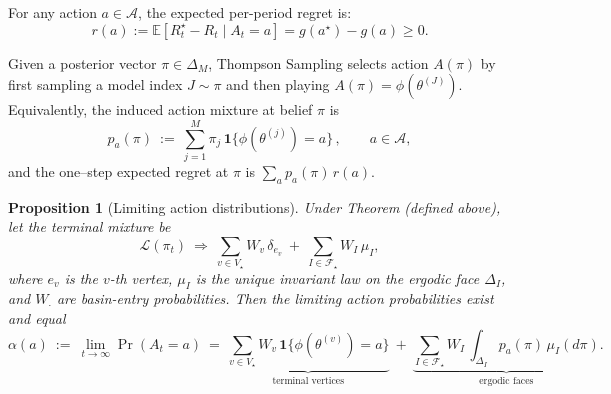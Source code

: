 \documentclass[12pt]{article}
\newtheorem{proposition}{Proposition}
\newcommand{\Law}{\mathcal{L}}
\begin{document}
For any action $a \in \mathcal{A}$, the expected per-period regret is:
\[
r(a) := \mathbb{E}[R_t^{\star} - R_t \mid A_t = a] = g(a^\star) - g(a) \geq 0.
\]

Given a posterior vector $\pi\in\Delta_M$, Thompson Sampling selects action $A(\pi)$ by first sampling a model index $J\sim \pi$ and then playing $A(\pi)=\phi(\theta^{(J)})$. 
Equivalently, the induced action mixture at belief $\pi$ is
\[
p_a(\pi)\ :=\ \sum_{j=1}^M \pi_j\,\mathbf{1}\{\phi(\theta^{(j)})=a\}\,,\qquad a\in\mathcal A,
\]
and the one–step expected regret at $\pi$ is $\sum_{a} p_a(\pi)\,r(a)$.

\begin{proposition}[Limiting action distributions]\label{prop:MM_limiting_action_dist}
Under Theorem (defined above), let the terminal mixture be
\[
\Law(\pi_t)\ \Rightarrow\ \sum_{v\in V_\star} W_v\,\delta_{e_v}\ +\ \sum_{I\in\mathcal F_\star} W_I\,\mu_I,
\]
where $e_v$ is the $v$-th vertex, $\mu_I$ is the unique invariant law on the ergodic face $\Delta_I$, and $W_\cdot$ are basin-entry probabilities. 
Then the limiting action probabilities exist and equal
\[
\alpha(a)\ :=\ \lim_{t\to\infty}\Pr(A_t=a)\ 
=\ \underbrace{\sum_{v\in V_\star} W_v\,\mathbf{1}\{\phi(\theta^{(v)})=a\}}_{\text{terminal vertices}}
\ +\ \underbrace{\sum_{I\in\mathcal F_\star} W_I\,\int_{\Delta_I} p_a(\pi)\, \mu_I(d\pi)}_{\text{ergodic faces}}.
\]
\end{proposition}
\end{document}

